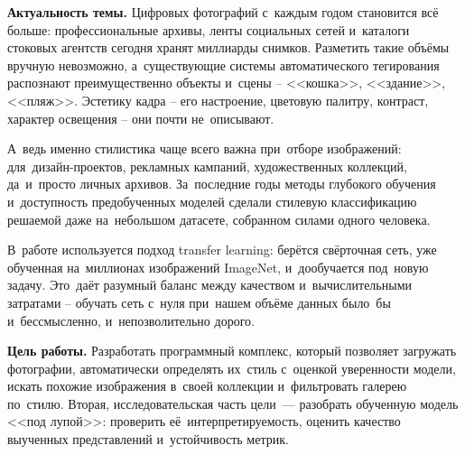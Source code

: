 \documentclass[a4paper,12pt]{diplom}
\begin{document}
\tableofcontents


\textbf{Актуальность темы.} Цифровых фотографий с~каждым годом становится всё больше: профессиональные архивы, ленты социальных сетей и~каталоги стоковых агентств сегодня хранят миллиарды снимков. Разметить такие объёмы вручную невозможно, а~существующие системы автоматического тегирования распознают преимущественно объекты и~сцены -- <<кошка>>, <<здание>>, <<пляж>>. Эстетику кадра -- его настроение, цветовую палитру, контраст, характер освещения -- они почти не~описывают.

А~ведь именно стилистика чаще всего важна при~отборе изображений: для~дизайн-проектов, рекламных кампаний, художественных коллекций, да~и~просто личных архивов. За~последние годы методы глубокого обучения и~доступность предобученных моделей сделали стилевую классификацию решаемой даже на~небольшом датасете, собранном силами одного человека.

В~работе используется подход transfer learning: берётся свёрточная сеть, уже обученная на~миллионах изображений ImageNet, и~дообучается под~новую задачу. Это~даёт разумный баланс между качеством и~вычислительными затратами -- обучать сеть с~нуля при~нашем объёме данных было~бы и~бессмысленно, и~непозволительно дорого.

\textbf{Цель работы.} Разработать программный комплекс, который позволяет загружать фотографии, автоматически определять их~стиль с~оценкой уверенности модели, искать похожие изображения в~своей коллекции и~фильтровать галерею по~стилю. Вторая, исследовательская часть цели~--- разобрать обученную модель <<под лупой>>: проверить её~интерпретируемость, оценить качество выученных представлений и~устойчивость метрик.
\end{document}
